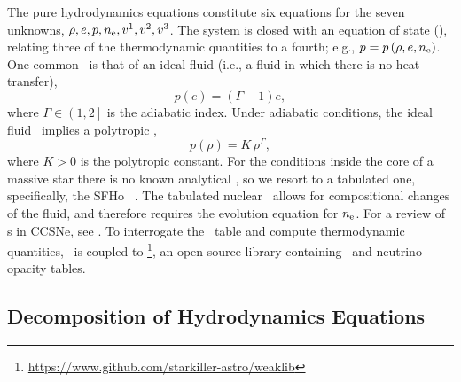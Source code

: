 The pure hydrodynamics equations
constitute six equations for the seven unknowns,
$\rho,e,p,n_{\mathrm{e}},v^{1},v^{2},v^{3}$.
The system is closed with an equation of state (\eos),
relating three of the thermodynamic quantities to a fourth;
e.g., $p=p\left(\rho,e,n_{\mathrm{e}}\right)$.
One common \eos\ is that of an ideal fluid
(i.e., a fluid in which there is no heat transfer),
\begin{equation}
  p\left(e\right)=\left(\Gamma-1\right)e,
\end{equation}
where $\Gamma\in\left(1,2\right]$ is the adiabatic index.
Under adiabatic conditions, the ideal fluid \eos\ implies a polytropic \eos,
\begin{equation}
  p\left(\rho\right)=K\,\rho^{\Gamma},
\end{equation}
where $K>0$ is the polytropic constant.
For the conditions inside the core of a massive star there is no known
analytical \eos, so we resort to a tabulated one,
specifically, the SFHo \eos\ \citep{shf2013}.
The tabulated nuclear \eos\ allows for compositional changes of the
fluid, and therefore requires the evolution equation for $n_{\mathrm{e}}$.
For a review of \eos s in CCSNe, see \citet{ohk2017}.
To interrogate the \eos\ table and compute thermodynamic quantities,
\thornado\ is coupled to \weaklib%
\footnote{\url{https://www.github.com/starkiller-astro/weaklib}},
an open-source library containing \eos\ and neutrino opacity tables.

\subsection{Decomposition of Hydrodynamics Equations}

